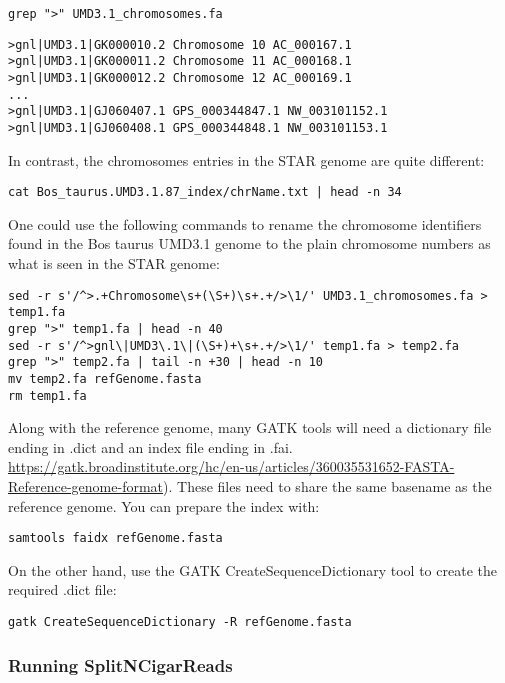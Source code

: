 \begin{verbatim}
grep ">" UMD3.1_chromosomes.fa
\end{verbatim}


\begin{verbatim}
>gnl|UMD3.1|GK000010.2 Chromosome 10 AC_000167.1
>gnl|UMD3.1|GK000011.2 Chromosome 11 AC_000168.1
>gnl|UMD3.1|GK000012.2 Chromosome 12 AC_000169.1
...
>gnl|UMD3.1|GJ060407.1 GPS_000344847.1 NW_003101152.1
>gnl|UMD3.1|GJ060408.1 GPS_000344848.1 NW_003101153.1
\end{verbatim}

In contrast, the chromosomes entries in the STAR genome are quite different:

\begin{verbatim}
cat Bos_taurus.UMD3.1.87_index/chrName.txt | head -n 34
\end{verbatim}


One could use the following commands to rename the chromosome identifiers found in the Bos taurus UMD3.1 genome to the plain chromosome numbers as what is seen in the STAR genome:

\begin{verbatim}
sed -r s'/^>.+Chromosome\s+(\S+)\s+.+/>\1/' UMD3.1_chromosomes.fa > temp1.fa
grep ">" temp1.fa | head -n 40
sed -r s'/^>gnl\|UMD3\.1\|(\S+)+\s+.+/>\1/' temp1.fa > temp2.fa
grep ">" temp2.fa | tail -n +30 | head -n 10
mv temp2.fa refGenome.fasta
rm temp1.fa
\end{verbatim}


Along with the reference genome, many GATK tools will need a dictionary file ending in .dict and an index file ending in .fai.\href{ https://gatk.broadinstitute.org/hc/en-us/articles/360035531652-FASTA-Reference-genome-format}{ https://gatk.broadinstitute.org/hc/en-us/articles/360035531652-FASTA-Reference-genome-format}). These files need to share the same basename as the reference genome. You can prepare the index with:

\begin{verbatim}
samtools faidx refGenome.fasta
\end{verbatim}

On the other hand, use the GATK CreateSequenceDictionary tool to create the required .dict file:

\begin{verbatim}
gatk CreateSequenceDictionary -R refGenome.fasta
\end{verbatim}




\subsubsection{Running SplitNCigarReads}

